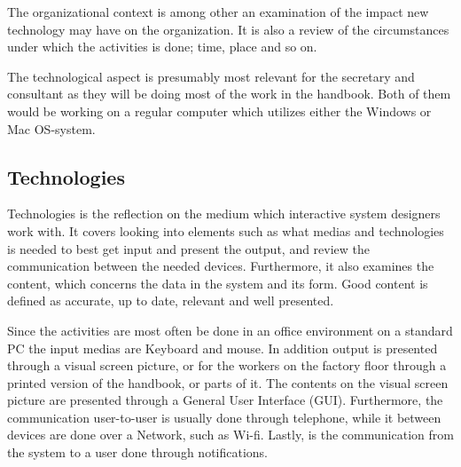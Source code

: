 
The organizational context is among other an examination of the impact new technology may have on the organization. 
It is also a review of the circumstances under which the activities is done; time, place and so on.
\citep{Benyon}

The technological aspect is presumably most relevant for the secretary and consultant as they will be doing most of the work in the handbook.
Both of them would be working on a regular computer which utilizes either the Windows or Mac OS-system. 


\subsection{Technologies}
Technologies is the reflection on the medium which interactive system designers work with.
It covers looking into elements such as what medias and technologies is needed to best get input and present the output, and review the communication between the needed devices.
Furthermore, it also examines the content, which concerns the data in the system and its form.
Good content is defined as accurate, up to date, relevant and well presented.
\citep{Benyon}

Since the activities are most often be done in an office environment on a standard PC the input medias are Keyboard and mouse.
In addition output is presented through a visual screen picture, or for the workers on the factory floor through a printed version of the handbook, or parts of it.
The contents on the visual screen picture are presented through a General User Interface (GUI).
Furthermore, the communication user-to-user is usually done through telephone, while it between devices are done over a Network, such as Wi-fi.
Lastly, is the communication from the system to a user done through notifications.
